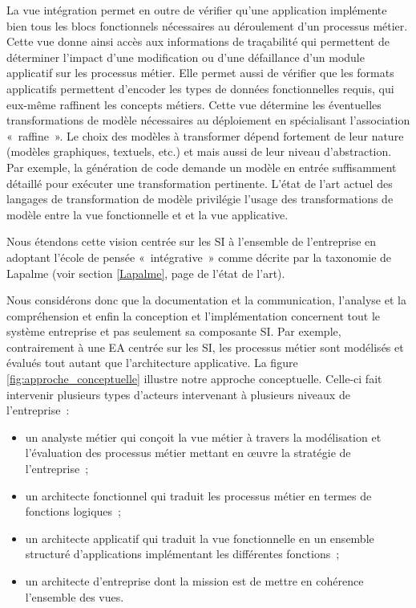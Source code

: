 La vue intégration permet en outre de vérifier qu'une application implémente
bien tous les blocs fonctionnels nécessaires au déroulement d'un processus
métier. Cette vue donne ainsi accès aux informations de traçabilité qui
permettent de déterminer l'impact d'une modification ou d'une défaillance d'un
module applicatif sur les processus métier. Elle permet aussi de vérifier que
les formats applicatifs permettent d'encoder les types de données fonctionnelles
requis, qui eux-même raffinent les concepts métiers. Cette vue détermine les
éventuelles transformations de modèle nécessaires au déploiement en spécialisant
l'association «~raffine~». Le choix des modèles à transformer dépend fortement
de leur nature (modèles graphiques, textuels, etc.) et mais aussi de leur niveau
d'abstraction. Par exemple, la génération de code demande un modèle en entrée
suffisamment détaillé pour exécuter une transformation pertinente. L'état de
l'art actuel des langages de transformation de modèle privilégie l'usage des
transformations de modèle entre la vue fonctionnelle et et la vue applicative.




 
Nous étendons cette vision centrée sur les SI à l'ensemble de l'entreprise en adoptant l'école
de pensée «~intégrative~» comme décrite par la taxonomie de Lapalme (voir
section \ref{Lapalme}, page \pageref{Lapalme} de l'état de l'art).

Nous considérons donc que la documentation et la communication, l'analyse et la
compréhension et enfin la conception et l'implémentation concernent tout le système entreprise et
pas seulement sa composante SI. Par exemple, contrairement à une EA centrée sur
les SI, les processus métier sont modélisés et évalués tout autant que
l'architecture applicative. La figure \ref{fig:approche_conceptuelle} illustre
notre approche conceptuelle. Celle-ci fait intervenir plusieurs types d'acteurs
intervenant à plusieurs niveaux de l'entreprise~: \begin{itemize} \item un
analyste métier qui conçoit la vue métier à travers la modélisation et
l'évaluation des processus métier mettant en œuvre la stratégie de
l'entreprise~; \item un architecte fonctionnel qui traduit les processus métier
en termes de fonctions logiques~; \item un architecte applicatif qui traduit la
vue fonctionnelle en un ensemble structuré d'applications implémentant les
différentes fonctions~; \item un architecte d'entreprise dont la mission est de
mettre en cohérence l'ensemble des vues. \end{itemize}

